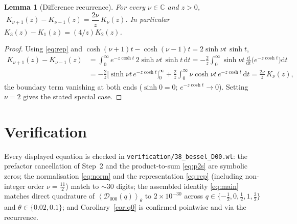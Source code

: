 \documentclass[11pt]{article}
\newtheorem{lemma}{Lemma}
\theoremstyle{definition}
\theoremstyle{remark}
\newcommand{\dd}{\mathrm{d}}
\newcommand{\Do}{\mathcal{D}}
\newcommand{\avg}[1]{\left\langle #1 \right\rangle}
\newcommand{\Cx}{\mathbb{C}}
\begin{document}
\begin{lemma}[Difference recurrence]
\label{lem:recur}
For every $\nu\in\Cx$ and $z>0$, $\;K_{\nu+1}(z)-K_{\nu-1}(z)=\dfrac{2\nu}{z}\,K_\nu(z)$. In particular
$K_3(z)-K_1(z)=(4/z)K_2(z)$.
\end{lemma}
\begin{proof}
Using \eqref{eq:rep} and $\cosh(\nu+1)t-\cosh(\nu-1)t=2\sinh\nu t\,\sinh t$,
\begin{align*}
  K_{\nu+1}(z)-K_{\nu-1}(z)
  &=\int_0^\infty e^{-z\cosh t}\,2\sinh\nu t\,\sinh t\,\dd t
   =-\frac{2}{z}\int_0^\infty \sinh\nu t\,\frac{\dd}{\dd t}\Big(e^{-z\cosh t}\Big)\dd t\\
  &=-\frac{2}{z}\Big[\sinh\nu t\,e^{-z\cosh t}\Big]_0^\infty
    +\frac{2}{z}\int_0^\infty \nu\cosh\nu t\,e^{-z\cosh t}\,\dd t
   =\frac{2\nu}{z}\,K_\nu(z),
\end{align*}
the boundary term vanishing at both ends ($\sinh 0=0$; $e^{-z\cosh t}\to0$). Setting $\nu=2$ gives the stated
special case.
\end{proof}

\section*{Verification}
Every displayed equation is checked in \texttt{verification/38\_bessel\_D00.wl}: the prefactor cancellation of
Step~2 and the product-to-sum \eqref{eq:p2s} are symbolic zeros; the normalisation \eqref{eq:norm} and the
representation \eqref{eq:rep} (including non-integer order $\nu=\tfrac{11}{2}$) match to $\sim30$ digits; the
assembled identity \eqref{eq:main} matches direct quadrature of $\avg{\Do_{000}(q)}_\theta$ to $2\times10^{-30}$
across $q\in\{-\tfrac12,0,\tfrac12,1,\tfrac32\}$ and $\theta\in\{0.02,0.1\}$; and Corollary~\ref{cor:q0} is
confirmed pointwise and via the recurrence.
\end{document}
